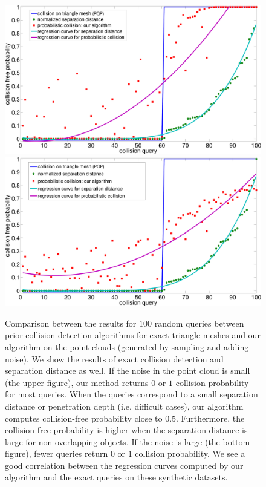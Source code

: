 \begin{figure}[htb]
  \centering
  \includegraphics[width=0.79\linewidth]{figs/7/smallnoise.pdf}
  \includegraphics[width=0.79\linewidth]{figs/7/largenoise.pdf}
  \caption[Comparison between the results for $100$ random queries between prior collision detection algorithms for exact triangle meshes and our
  algorithm on the point clouds]{\label{fig:7:res1} Comparison between the results for $100$ random queries between prior collision detection algorithms for exact triangle meshes and our
  algorithm on the point clouds (generated by sampling and adding noise). We show the results of exact collision detection and separation distance as well. If the noise in
  the point cloud is small (the upper figure), our method returns $0$ or $1$ collision probability for most queries. When the queries correspond to a small separation distance or penetration depth (i.e. difficult cases), our algorithm computes collision-free probability close to $0.5$.
  Furthermore, the collision-free probability is higher when the separation distance is large for non-overlapping objects. If
  the noise is large (the bottom figure), fewer queries return $0$ or $1$ collision probability. We see a good correlation between the regression
  curves computed by our algorithm and the exact queries on these synthetic datasets.}
\end{figure}

